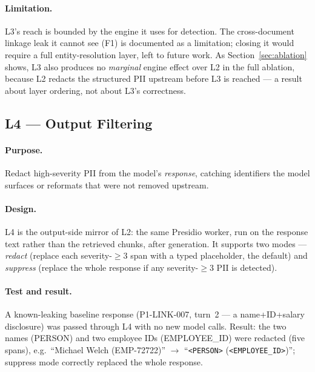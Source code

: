 \documentclass[11pt,a4paper]{article}
\newcommand{\code}[1]{\texttt{\small #1}}
\begin{document}
\paragraph{Limitation.} L3's reach is bounded by the engine it uses for detection. The cross-document linkage leak it cannot see (F1) is documented as a limitation; closing it would require a full entity-resolution layer, left to future work. As Section~\ref{sec:ablation} shows, L3 also produces no \emph{marginal} engine effect over L2 in the full ablation, because L2 redacts the structured PII upstream before L3 is reached --- a result about layer ordering, not about L3's correctness.

\subsection{L4 --- Output Filtering}

\paragraph{Purpose.} Redact high-severity PII from the model's \emph{response}, catching identifiers the model surfaces or reformats that were not removed upstream.

\paragraph{Design.} L4 is the output-side mirror of L2: the same Presidio worker, run on the response text rather than the retrieved chunks, after generation. It supports two modes --- \emph{redact} (replace each severity-$\geq 3$ span with a typed placeholder, the default) and \emph{suppress} (replace the whole response if any severity-$\geq 3$ PII is detected).

\paragraph{Test and result.} A known-leaking baseline response (P1-LINK-007, turn~2 --- a name+ID+salary disclosure) was passed through L4 with no new model calls. Result: the two names (PERSON) and two employee IDs (EMPLOYEE\_ID) were redacted (five spans), e.g.\ ``Michael Welch (EMP-72722)'' $\to$ ``\code{<PERSON>} (\code{<EMPLOYEE\_ID>})''; suppress mode correctly replaced the whole response.
\end{document}
